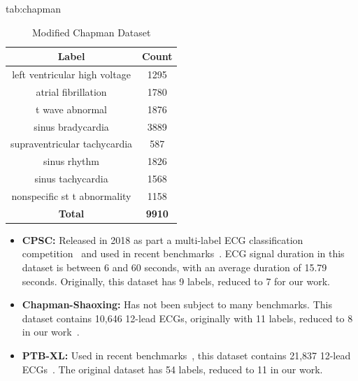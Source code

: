 \documentclass[pmlr,twocolumn]{jmlr}%
\begin{document}
\begin{table}[tbp]
\floatconts
  {tab:chapman}%
  {\caption{Modified Chapman Dataset}}%
  {
    \begin{tabular}{|c|c|}
     \hline
    Label & Count \\
     \hline
    left ventricular high voltage &  1295 \\
    atrial fibrillation           &  1780 \\
    t wave abnormal               &  1876 \\
    sinus bradycardia             &  3889 \\
    supraventricular tachycardia  &   587 \\
    sinus rhythm                  &  1826 \\
    sinus tachycardia             &  1568 \\
    nonspecific st t abnormality  &  1158 \\
     \hline
    \textbf{Total} & \textbf{9910}\\
    \hline
    \end{tabular}
  }
\end{table}

\begin{itemize}
    \item \textbf{CPSC:} Released in 2018 as part a multi-label ECG classification competition~\citep{liu2018open} and used in recent benchmarks~\citep{strodthoff2020deep}. ECG signal duration in this dataset is between 6 and 60 seconds, with an average duration of 15.79 seconds. Originally, this dataset has 9 labels, reduced to 7 for our work.
    \item \textbf{Chapman-Shaoxing:} Has not been subject to many benchmarks. This dataset contains 10,646 12-lead ECGs, originally with 11 labels, reduced to 8 in our work~\citep{zheng202012}.
    \item \textbf{PTB-XL:} Used in recent benchmarks~\citep{strodthoff2020deep}, this dataset contains 21,837 12-lead ECGs~\citep{wagner2020ptb}. The original dataset has 54 labels, reduced to 11 in our work. 
\end{itemize}
\end{document}
